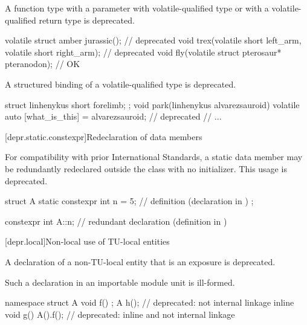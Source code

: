 \pnum
A function type
with a parameter with volatile-qualified type or
with a volatile-qualified return type is deprecated.

\begin{example}
\begin{codeblock}
volatile struct amber jurassic();                               // deprecated
void trex(volatile short left_arm, volatile short right_arm);   // deprecated
void fly(volatile struct pterosaur* pteranodon);                // OK
\end{codeblock}
\end{example}


\pnum
A structured binding of a volatile-qualified type
is deprecated.

\begin{example}
\begin{codeblock}
struct linhenykus { short forelimb; };
void park(linhenykus alvarezsauroid) {
  volatile auto [what_is_this] = alvarezsauroid;                // deprecated
  // ...
}
\end{codeblock}
\end{example}


[depr.static.constexpr]{Redeclaration of  data members}

\pnum
For compatibility with prior \Cpp{} International Standards, a 
static data member may be redundantly redeclared outside the class with no initializer.
This usage is deprecated.
\begin{example}
\begin{codeblock}
struct A {
  static constexpr int n = 5;   // definition (declaration in \CppXIV{})
};

constexpr int A::n;             // redundant declaration (definition in \CppXIV{})
\end{codeblock}
\end{example}

[depr.local]{Non-local use of TU-local entities}

\pnum
A declaration of a non-TU-local entity that is an exposure
is deprecated.
\begin{note}
Such a declaration in an importable module unit is ill-formed.
\end{note}
\begin{example}
\begin{codeblock}
namespace {
  struct A {
    void f() {}
  };
}
A h();                          // deprecated: not internal linkage
inline void g() {A().f();}      // deprecated: inline and not internal linkage
\end{codeblock}
\end{example}

